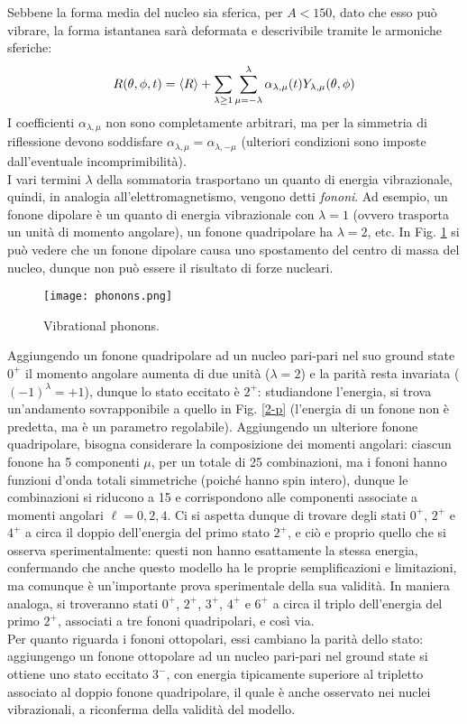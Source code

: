 Sebbene la forma media del nucleo sia sferica, per $ A < 150 $, dato che esso può vibrare, la forma istantanea sarà deformata e descrivibile tramite le armoniche sferiche:
\begin{equation}
	R(\theta,\phi,t) = \braket{R} + \sum_{\lambda \ge 1} \sum_{\mu = -\lambda}^{\lambda} \alpha_{\lambda,\mu}(t) Y_{\lambda,\mu}(\theta,\phi)
	\label{eq:5.11}
\end{equation}
I coefficienti $ \alpha_{\lambda,\mu} $ non sono completamente arbitrari, ma per la simmetria di riflessione devono soddisfare $ \alpha_{\lambda,\mu} = \alpha_{\lambda,-\mu} $ (ulteriori condizioni sono imposte dall'eventuale incomprimibilità).\\
I vari termini $ \lambda $ della sommatoria trasportano un quanto di energia vibrazionale, quindi, in analogia all'elettromagnetismo, vengono detti \textit{fononi}. Ad esempio, un fonone dipolare è un quanto di energia vibrazionale con $ \lambda = 1 $ (ovvero trasporta un unità di momento angolare), un fonone quadripolare ha $ \lambda = 2 $, etc. In Fig. \ref{phon} si può vedere che un fonone dipolare causa uno spostamento del centro di massa del nucleo, dunque non può essere il risultato di forze nucleari.

\begin{figure}[!t]
	\centering
	\texttt{[image: phonons.png]}
	\caption{Vibrational phonons.}
	\label{phon}
\end{figure}

Aggiungendo un fonone quadripolare ad un nucleo pari-pari nel suo ground state $ 0^+ $ il momento angolare aumenta di due unità ($ \lambda = 2 $) e la parità resta invariata ($ (-1)^{\lambda} = +1 $), dunque lo stato eccitato è $ 2^+ $: studiandone l'energia, si trova un'andamento sovrapponibile a quello in Fig. \ref{2-p} (l'energia di un fonone non è predetta, ma è un parametro regolabile). Aggiungendo un ulteriore fonone quadripolare, bisogna considerare la composizione dei momenti angolari: ciascun fonone ha 5 componenti $ \mu $, per un totale di 25 combinazioni, ma i fononi hanno funzioni d'onda totali simmetriche (poiché hanno spin intero), dunque le combinazioni si riducono a 15 e corrispondono alle componenti associate a momenti angolari $ \ell = 0,2,4 $. Ci si aspetta dunque di trovare degli stati $ 0^+ $, $ 2^+ $ e $ 4^+ $ a circa il doppio dell'energia del primo stato $ 2^+ $, e ciò e proprio quello che si osserva sperimentalmente: questi non hanno esattamente la stessa energia, confermando che anche questo modello ha le proprie semplificazioni e limitazioni, ma comunque è un'importante prova sperimentale della sua validità. In maniera analoga, si troveranno stati $ 0^+ $, $ 2^+ $, $ 3^+ $, $ 4^+ $ e $ 6^+ $ a circa il triplo dell'energia del primo $ 2^+ $, associati a tre fononi quadripolari, e così via.\\
Per quanto riguarda i fononi ottopolari, essi cambiano la parità dello stato: aggiungengo un fonone ottopolare ad un nucleo pari-pari nel ground state si ottiene uno stato eccitato $ 3^- $, con energia tipicamente superiore al tripletto associato al doppio fonone quadripolare, il quale è anche osservato nei nuclei vibrazionali, a riconferma della validità del modello.


